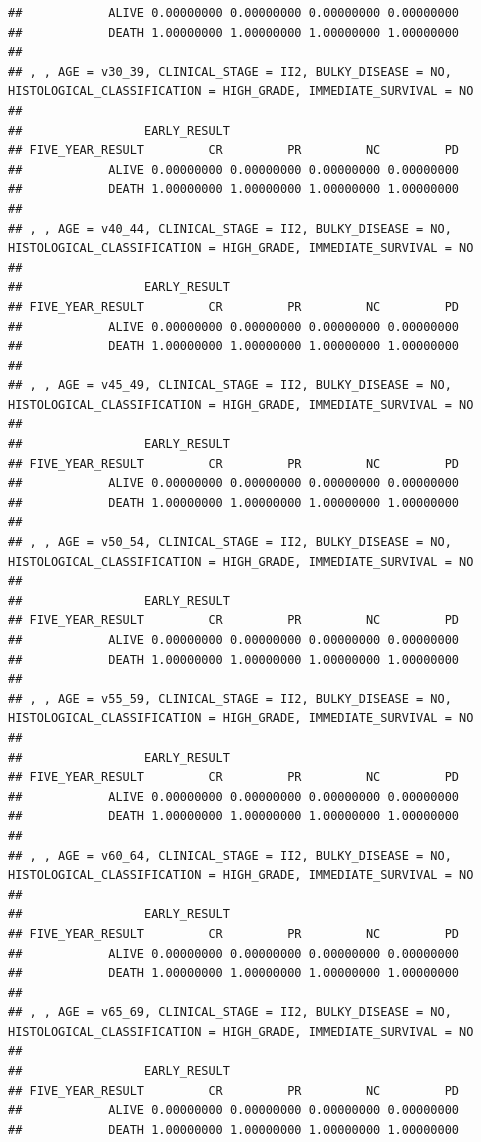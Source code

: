 \documentclass[]{article}
\begin{document}
\begin{verbatim}
##            ALIVE 0.00000000 0.00000000 0.00000000 0.00000000
##            DEATH 1.00000000 1.00000000 1.00000000 1.00000000
## 
## , , AGE = v30_39, CLINICAL_STAGE = II2, BULKY_DISEASE = NO, HISTOLOGICAL_CLASSIFICATION = HIGH_GRADE, IMMEDIATE_SURVIVAL = NO
## 
##                 EARLY_RESULT
## FIVE_YEAR_RESULT         CR         PR         NC         PD
##            ALIVE 0.00000000 0.00000000 0.00000000 0.00000000
##            DEATH 1.00000000 1.00000000 1.00000000 1.00000000
## 
## , , AGE = v40_44, CLINICAL_STAGE = II2, BULKY_DISEASE = NO, HISTOLOGICAL_CLASSIFICATION = HIGH_GRADE, IMMEDIATE_SURVIVAL = NO
## 
##                 EARLY_RESULT
## FIVE_YEAR_RESULT         CR         PR         NC         PD
##            ALIVE 0.00000000 0.00000000 0.00000000 0.00000000
##            DEATH 1.00000000 1.00000000 1.00000000 1.00000000
## 
## , , AGE = v45_49, CLINICAL_STAGE = II2, BULKY_DISEASE = NO, HISTOLOGICAL_CLASSIFICATION = HIGH_GRADE, IMMEDIATE_SURVIVAL = NO
## 
##                 EARLY_RESULT
## FIVE_YEAR_RESULT         CR         PR         NC         PD
##            ALIVE 0.00000000 0.00000000 0.00000000 0.00000000
##            DEATH 1.00000000 1.00000000 1.00000000 1.00000000
## 
## , , AGE = v50_54, CLINICAL_STAGE = II2, BULKY_DISEASE = NO, HISTOLOGICAL_CLASSIFICATION = HIGH_GRADE, IMMEDIATE_SURVIVAL = NO
## 
##                 EARLY_RESULT
## FIVE_YEAR_RESULT         CR         PR         NC         PD
##            ALIVE 0.00000000 0.00000000 0.00000000 0.00000000
##            DEATH 1.00000000 1.00000000 1.00000000 1.00000000
## 
## , , AGE = v55_59, CLINICAL_STAGE = II2, BULKY_DISEASE = NO, HISTOLOGICAL_CLASSIFICATION = HIGH_GRADE, IMMEDIATE_SURVIVAL = NO
## 
##                 EARLY_RESULT
## FIVE_YEAR_RESULT         CR         PR         NC         PD
##            ALIVE 0.00000000 0.00000000 0.00000000 0.00000000
##            DEATH 1.00000000 1.00000000 1.00000000 1.00000000
## 
## , , AGE = v60_64, CLINICAL_STAGE = II2, BULKY_DISEASE = NO, HISTOLOGICAL_CLASSIFICATION = HIGH_GRADE, IMMEDIATE_SURVIVAL = NO
## 
##                 EARLY_RESULT
## FIVE_YEAR_RESULT         CR         PR         NC         PD
##            ALIVE 0.00000000 0.00000000 0.00000000 0.00000000
##            DEATH 1.00000000 1.00000000 1.00000000 1.00000000
## 
## , , AGE = v65_69, CLINICAL_STAGE = II2, BULKY_DISEASE = NO, HISTOLOGICAL_CLASSIFICATION = HIGH_GRADE, IMMEDIATE_SURVIVAL = NO
## 
##                 EARLY_RESULT
## FIVE_YEAR_RESULT         CR         PR         NC         PD
##            ALIVE 0.00000000 0.00000000 0.00000000 0.00000000
##            DEATH 1.00000000 1.00000000 1.00000000 1.00000000

\end{verbatim}
\end{document}
